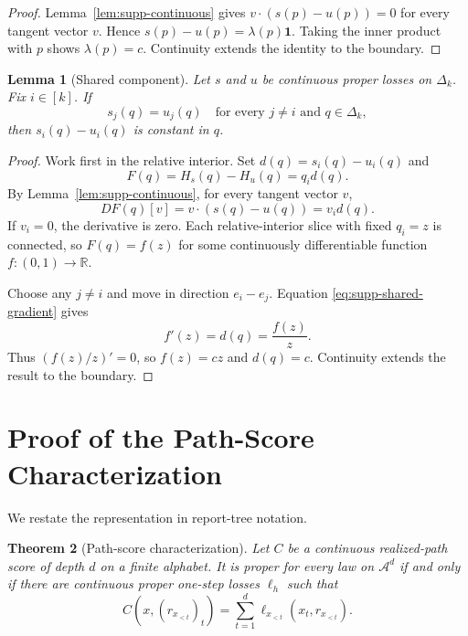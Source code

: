 \documentclass[twoside]{article}
\newtheorem{theorem}{Theorem}
\newtheorem{lemma}[theorem]{Lemma}
\newcommand{\cA}{\mathcal A}
\newcommand{\1}{\mathbf 1}
\begin{document}
\begin{proof}
Lemma~\ref{lem:supp-continuous} gives
$v\cdot(s(p)-u(p))=0$ for every tangent vector $v$. Hence
$s(p)-u(p)=\lambda(p)\1$. Taking the inner product with $p$ shows
$\lambda(p)=c$. Continuity extends the identity to the boundary.
\end{proof}

\begin{lemma}[Shared component]
\label{lem:supp-shared}
Let $s$ and $u$ be continuous proper losses on $\Delta_k$. Fix $i\in[k]$.
If
\begin{equation*}
 s_j(q)=u_j(q)\quad\text{for every }j\ne i\text{ and }q\in\Delta_k,
\end{equation*}
then $s_i(q)-u_i(q)$ is constant in $q$.
\end{lemma}

\begin{proof}
Work first in the relative interior. Set
$d(q)=s_i(q)-u_i(q)$ and
\begin{equation*}
 F(q)=H_s(q)-H_u(q)=q_i d(q).
\end{equation*}
By Lemma~\ref{lem:supp-continuous}, for every tangent vector $v$,
\begin{equation}
 D F(q)[v]=v\cdot(s(q)-u(q))=v_i d(q).
 \label{eq:supp-shared-gradient}
\end{equation}
If $v_i=0$, the derivative is zero. Each relative-interior slice with fixed
$q_i=z$ is connected, so $F(q)=f(z)$ for some continuously differentiable
function $f:(0,1)\to\mathbb R$.

Choose any $j\ne i$ and move in direction $e_i-e_j$. Equation
\eqref{eq:supp-shared-gradient} gives
\begin{equation*}
 f'(z)=d(q)=\frac{f(z)}{z}.
\end{equation*}
Thus $(f(z)/z)'=0$, so $f(z)=cz$ and $d(q)=c$. Continuity extends the result
to the boundary.
\end{proof}

\section{Proof of the Path-Score Characterization}
\label{app:structure}

We restate the representation in report-tree notation.

\begin{theorem}[Path-score characterization]
\label{thm:supp-structure}
Let $C$ be a continuous realized-path score of depth $d$ on a finite alphabet.
It is proper for every law on $\cA^d$ if and only if there are continuous
proper one-step losses $\ell_h$ such that
\begin{equation}
 C(x,(r_{x_{<t}})_t)=\sum_{t=1}^d
 \ell_{x_{<t}}(x_t,r_{x_{<t}}).
 \label{eq:supp-additive}
\end{equation}
\end{theorem}
\end{document}
